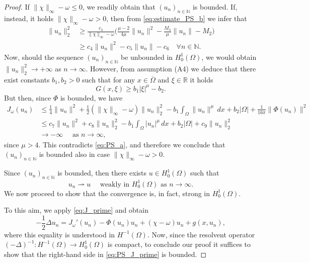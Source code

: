 \documentclass[10pt,a4paper]{amsart}
\numberwithin{equation}{section}
\begin{document}
\begin{proof}
If $\|\chi\|_\infty - \omega \leq 0$, we readily obtain that $(u_n)_{n \in \mathbb N}$ 
is bounded. If, instead, it holds $\|\chi\|_\infty - \omega > 0$, then from 
\eqref{eq:estimate_PS_b} we infer that
 \begin{align*}
 \|u_n\|_2^2
 & \geq \frac{c_3}{\|\chi\|_\infty - \omega} 
  \Big( \frac{\mu - 2}{4\mu}\|u_n\|^2 - \frac{M_3}{\mu}\|u_n\| - M_2 \Big)  \\
 & \geq c_4 \|u_n\|^2 - c_5\|u_n\| - c_6 \quad \forall n \in \mathbb N.
 \end{align*}
Now, should the sequence $(u_n)_{n \in \mathbb N}$ be unbounded in $H_0^1(\Omega)$, 
we would obtain $\|u_n\|_2^2 \to + \infty$ as $n \to \infty$. 
However, from assumption (A4) we deduce that there exist constants $b_1, b_2 > 0$ 
such that for any $x \in \overline \Omega$ and $\xi \in \mathbb R$ it holds
 \[
 G(x, \xi) \geq b_1 |\xi|^\mu - b_2.
 \]
But then, since $\Phi$ is bounded, we have
 \begin{align*}
 J_\omega(u_n)
& \leq \frac{1}{4}\|u_n\|^2 + \frac{1}{2}(\|\chi\|_\infty 
 - \omega) \|u_n\|_2^2 - b_1 \int_\Omega \|u_n\|^\mu \,dx 
 + b_2 |\Omega| + \frac{1}{16\pi}\|\Phi(u_n)\|^2  \\
& \leq c_7\|u_n\|^2 + c_8 \|u_n\|_2^2 - b_1 \int_\Omega |u_n|^\mu \,dx 
 + b_2|\Omega| + c_9\|u_n\|_2^2  \\
& \to - \infty \quad \text{ as } n \to \infty,
\end{align*}
since $\mu > 4$. This contradicts \eqref{eq:PS_a}, and therefore we conclude that 
$(u_n)_{n \in \mathbb N}$ is bounded also in case $\|\chi\|_\infty - \omega > 0$.

Since $(u_n)_{n \in \mathbb N}$ is bounded, then there exists $u \in H_0^1(\Omega)$ 
such that
 \[
 u_n \rightharpoonup u \quad \text{ weakly in } H_0^1(\Omega) \text{ as } n \to \infty.
 \]
We now proceed to show that the convergence is, in fact, strong in $H_0^1(\Omega)$.

To this aim, we apply \eqref{eq:J_prime} and obtain
\begin{equation}
 \label{eq:PS_J_prime}
 - \frac{1}{2} \Delta u_n = J_\omega'(u_n) - \Phi(u_n)u_n + (\chi - \omega) u_n + g(x, u_n),
\end{equation}
where this equality is understood in $H^{-1}(\Omega)$. Now, since the resolvent operator 
$(- \Delta)^{-1}: H^{-1}(\Omega) \to H_0^1(\Omega)$ is compact, to conclude our proof 
it suffices to show that the right-hand side in \eqref{eq:PS_J_prime} is bounded.


\end{proof}
\end{document}
